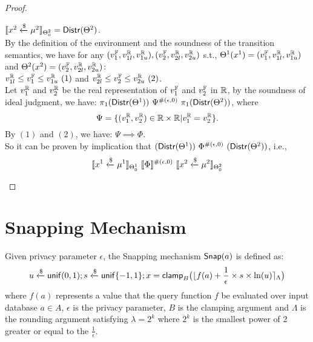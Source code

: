 \documentclass[a4paper,11pt]{article}
\begin{document}
\begin{proof}
\begin{itemize}
	$\llbracket x^2 \xleftarrow{\$} \mu^2 \rrbracket_{\Theta^2_0} = \mathsf{Distr}(\Theta^2)$. \\
	By the definition of the environment and the soundness of the transition semantics, we have for any $(v^{\mathbb{F}}_1, v^{\mathbb{R}}_{1l}, v^{\mathbb{R}}_{1u}), (v^{\mathbb{F}}_2, v^{\mathbb{R}}_{2l}, v^{\mathbb{R}}_{2u})$ s.t.,
	$\Theta^1 (x^1) = (v^{\mathbb{F}}_1, v^{\mathbb{R}}_{1l}, v^{\mathbb{R}}_{1u})$
	and
	$\Theta^2 (x^2) = (v^{\mathbb{F}}_2, v^{\mathbb{R}}_{2l}, v^{\mathbb{R}}_{2u})$:
	\\
	$ v^{\mathbb{R}}_{1l} \leq v^{\mathbb{F}}_1 \leq v^{\mathbb{R}}_{1u} ~ (1)$ 
	and
	$ v^{\mathbb{R}}_{2l} \leq v^{\mathbb{F}}_2 \leq v^{\mathbb{R}}_{2u} ~ (2)$.
	\\
	Let $v^{\mathbb{R}}_1$ and $v^{\mathbb{R}}_2$ be the real representation of $v^{\mathbb{F}}_1$ and $v^{\mathbb{F}}_2$ in $\mathbb{R}$, by the soundness of ideal judgment, we have:
	$\pi_1 (\mathsf{Distr}(\Theta^1)) ~ \Psi^{\#(\epsilon, 0)} ~ \pi_1 (\mathsf{Distr}(\Theta^2))$, where
	\[
		\Psi = \{(v^{\mathbb{R}}_1, v^{\mathbb{R}}_2) \in \mathbb{R} \times \mathbb{R}
		| 
		v^{\mathbb{R}}_1 = v^{\mathbb{R}}_2 \}.
	\]
	By $(1)$ and $(2)$, we have:
	$\Psi \implies \Phi$.
	\\
	So it can be proven by implication that 
	$(\mathsf{Distr}(\Theta^1)) ~ \Phi^{\#(\epsilon, 0)} ~ (\mathsf{Distr}(\Theta^2))$, i.e., 
	$$
	\llbracket x^1 \xleftarrow{\$} \mu^1 \rrbracket_{\Theta^1_0} 
		~ \llbracket \Phi \rrbracket^{\#(\epsilon, 0)} ~
		\llbracket x^2 \xleftarrow{\$} \mu^2 \rrbracket_{\Theta^2_0}
	$$
	\end{itemize}
\end{proof}


\newpage
\section{Snapping Mechanism}

\begin{defn}
Given privacy parameter $\epsilon$, the Snapping mechanism $\mathsf{Snap}(a)$ is defined as:
\[
	u \xleftarrow{\$} \mathsf{unif}(0,1); s \xleftarrow{\$} \mathsf{unif}\{-1, 1\};
	x = \mathsf{clamp}_B \big(
	\lfloor f(a) + \frac{1}{\epsilon} \times s \times \ln (u) \rceil_{\Lambda}
	\big)
\]
where $f(a)$ represents a value that the query function $f$ be evaluated over input database $a \in A$, $\epsilon$ is the privacy parameter, $B$ is the clamping argument and $\Lambda$ is the rounding argument satisfying $\lambda = 2^k$ where $2^k$ is the smallest power of 2 greater or equal to the $\frac{1}{\epsilon}$.
\end{defn}
\end{document}
